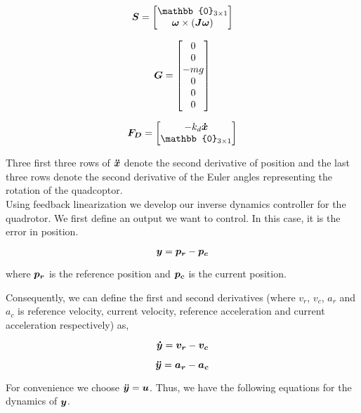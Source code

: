 \documentclass[12pt,fleqn]{article}
\newcommand{\mbm}[1]{\mbox{\boldmath $#1$}}
\begin{document}
$$ \mbm{S} = \begin{bmatrix} \mathbb{0}_{3\times1} \\ \mbm{\omega} \times
  (\mbm{J\omega}) \end{bmatrix} $$

$$ \mbm{G} = \begin{bmatrix} 0 \\ 0\\ -mg\\ 0\\ 0\\ 0 \end{bmatrix} $$

$$ \mbm{F_D} = \begin{bmatrix} -k_d \mbm{\dot{x}}\\
  \mathbb{0}_{3\times1} \end{bmatrix} $$

Three first three rows of $\mbm{\ddot{x}}$ denote the second derivative of
position and the last three rows denote the second derivative of the
Euler angles representing the rotation of the quadcoptor.\\

Using feedback linearization we develop our inverse dynamics
controller for the quadrotor. We first define an output we want to
control. In this case, it is the error in position.

\begin{equation} \label{y}
$$ \mbm{y} = \mbm{p_r} - \mbm{p_c} $$ 
\end{equation}

where $\mbm{p_r}$ is the reference position and $\mbm{p_c}$ is the current
position.

Consequently, we can define the first and second derivatives (where
$v_r$, $v_c$, $a_r$ and $a_c$ is reference velocity, current velocity,
reference acceleration and current acceleration respectively) as,

\begin{equation} \label{ydot}
$$ \mbm{\dot{y}} = \mbm{v_r} - \mbm{v_c} $$
\end{equation}

\begin{equation} \label{accel}
$$ \mbm{\ddot{y}} = \mbm{a_r} - \mbm{a_c} $$
\end{equation}

For convenience we choose $\mbm{\ddot{y}} = \mbm{u}$. Thus, we have
the following equations for the dynamics of $\mbm{y}$.
\end{document}
